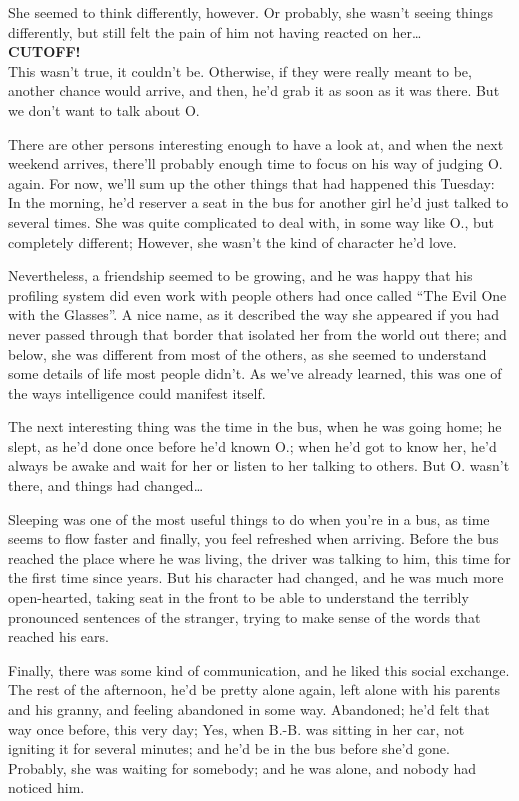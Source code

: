 She seemed to think differently, however. 
Or probably, she wasn't seeing things differently, but still felt the pain of him not having reacted on her\ldots\\
\textbf{CUTOFF!}\\
This wasn't true, it couldn't be. Otherwise, if they were really meant to be, another chance would arrive, and then, he'd grab it as soon as it was there. 
But we don't want to talk about O.

There are other persons interesting enough to have a look at, and when the next weekend arrives, there'll probably enough time to focus on his way of judging O. again. 
For now, we'll sum up the other things that had happened this Tuesday: In the morning, he'd reserver a seat in the bus for another girl he'd just talked to several times. She was quite complicated to deal with, in some way like O., but completely different; However, she wasn't the kind of character he'd love.

Nevertheless, a friendship seemed to be growing, and he was happy that his profiling system did even work with people others had once called \enquote{The Evil One with the Glasses}. 
A nice name, as it described the way she appeared if you had never passed through that border that isolated her from the world out there; and below, she was different from most of the others, as she seemed to understand some details of life most people didn't. As we've already learned, this was one of the ways intelligence could manifest itself.

The next interesting thing was the time in the bus, when he was going home; he slept, as he'd done once before he'd known O.; when he'd got to know her, he'd always be awake and wait for her or listen to her talking to others. But O. wasn't there, and things had changed\ldots

Sleeping was one of the most useful things to do when you're in a bus, as time seems to flow faster and finally, you feel refreshed when arriving. 
Before the bus reached the place where he was living, the driver was talking to him, this time for the first time since years. 
But his character had changed, and he was much more open-hearted, taking seat in the front to be able to understand the terribly pronounced sentences of the stranger, trying to make sense of the words that reached his ears.

Finally, there was some kind of communication, and he liked this social exchange. 
The rest of the afternoon, he'd be pretty alone again, left alone with his parents and his granny, and feeling abandoned in some way. 
Abandoned; he'd felt that way once before, this very day; Yes, when B.-B. was sitting in her car, not igniting it for several minutes; and he'd be in the bus before she'd gone. Probably, she was waiting for somebody; and he was alone, and nobody had noticed him.

